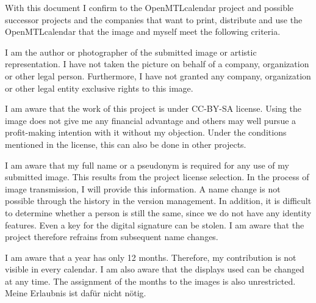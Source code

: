 \documentclass[parskip=half]{scrreprt}
\begin{document}
 
With this document I confirm to the OpenMTLcalendar project and possible successor projects and the companies that want to print, distribute and use the OpenMTLcalendar that the image and myself meet the following criteria.
\begin{contract}
	I am the author or photographer of the submitted image or artistic representation. I have not taken the picture on behalf of a company, organization or other legal person. Furthermore, I have not granted any company, organization or other legal entity exclusive rights to this image.
	
	I am aware that the work of this project is under CC-BY-SA license. Using the image does not give me any financial advantage and others may well pursue a profit-making intention with it without my objection. Under the conditions mentioned in the license, this can also be done in other projects.
	
	I am aware that my full name or a pseudonym is required for any use of my submitted image. This results from the project license selection. In the process of image transmission, I will provide this information. A name change is not possible through the history in the version management. In addition, it is difficult to determine whether a person is still the same, since we do not have any identity features. Even a key for the digital signature can be stolen. I am aware that the project therefore refrains from subsequent name changes.
	
	I am aware that a year has only 12 months. Therefore, my contribution is not visible in every calendar. I am also aware that the displays used can be changed at any time. The assignment of the months to the images is also unrestricted. Meine Erlaubnis ist dafür nicht nötig.
\end{contract}
\end{document}
